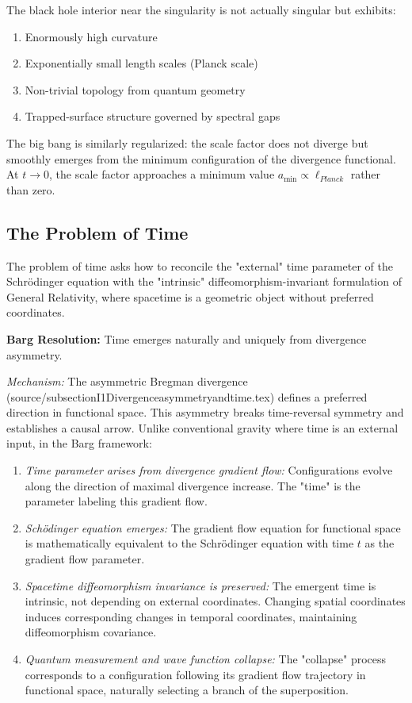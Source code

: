\documentclass[12pt,a4paper]{article}
\begin{document}
The black hole interior near the singularity is not actually singular but exhibits:
\begin{enumerate}
\item Enormously high curvature
\item Exponentially small length scales (Planck scale)
\item Non-trivial topology from quantum geometry
\item Trapped-surface structure governed by spectral gaps
\end{enumerate}

The big bang is similarly regularized: the scale factor does not diverge but smoothly emerges from the minimum configuration of the divergence functional. At $t \to 0$, the scale factor approaches a minimum value $a_{\min} \propto \ell_{Planck}$ rather than zero.

\subsection{The Problem of Time}

The problem of time asks how to reconcile the "external" time parameter of the Schrödinger equation with the "intrinsic" diffeomorphism-invariant formulation of General Relativity, where spacetime is a geometric object without preferred coordinates.

\textbf{Barg Resolution:} Time emerges naturally and uniquely from divergence asymmetry.

\textit{Mechanism:} The asymmetric Bregman divergence (source/subsectionI1Divergenceasymmetryandtime.tex) defines a preferred direction in functional space. This asymmetry breaks time-reversal symmetry and establishes a causal arrow. Unlike conventional gravity where time is an external input, in the Barg framework:

\begin{enumerate}
\item \textit{Time parameter arises from divergence gradient flow:} Configurations evolve along the direction of maximal divergence increase. The "time" is the parameter labeling this gradient flow.

\item \textit{Schödinger equation emerges:} The gradient flow equation for functional space is mathematically equivalent to the Schrödinger equation with time $t$ as the gradient flow parameter.

\item \textit{Spacetime diffeomorphism invariance is preserved:} The emergent time is intrinsic, not depending on external coordinates. Changing spatial coordinates induces corresponding changes in temporal coordinates, maintaining diffeomorphism covariance.

\item \textit{Quantum measurement and wave function collapse:} The "collapse" process corresponds to a configuration following its gradient flow trajectory in functional space, naturally selecting a branch of the superposition.
\end{enumerate}
\end{document}
